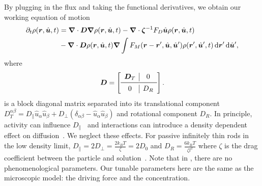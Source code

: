 By plugging in the flux and taking the functional derivatives,  we obtain our
working equation of motion
%
\begin{equation} 
  \label{eqn:working}
  \begin{aligned}
    \partial_t \rho(\bm{r}, \hat{\bm{u}}, t) &= 
    \bm{\nabla} \cdot  \bm{D} \bm{\nabla} \rho (\bm{r}, \hat{\bm{u}}, t) 
    - \bm{\nabla}  \cdot \bm{\zeta}^{-1} F_D 
    \hat{\bm{u}} \rho( \bm{r}, \hat{\bm{u}}, t ) \\
    &-\bm{\nabla} \cdot  \bm{D}  \rho (\bm{r}, \hat{\bm{u}}, t)
    \bm{\nabla}
    \int  F_{M}(\bm{r} - \bm{r}',\hat{\bm{u}}, \hat{\bm{u}}') 
    \rho(\bm{r}',\hat{\bm{u}}',t)  \mathop{}\!\mathrm{d} \bm{r}' \mathop{}\!\mathrm{d} \hat{\bm{u}}',
  \end{aligned} 
\end{equation}
%
where
\begin{equation}
  \bm{D} =
\left[
\begin{array}{c c c}
  \bm{D}_T & \rvline & 0\\
\midrule
 0  & \rvline & D_R
 \end{array}
\right].
\end{equation}
%
is a block diagonal matrix separated into its translational component $
D_T^{\alpha \beta} = D_{\parallel} \hat{u}_{\alpha} \hat{u}_{\beta} + D_{\perp}
(\delta_{\alpha \beta} - \hat{u}_{\alpha} \hat{u}_{\beta} ) $ and rotational
component $D_R$. In principle, activity can influence
$D_{\parallel}$~\cite{baskaran_enhanced_08} and interactions can introduce a
density dependent effect on diffusion~\cite{doi_theory_88}. We neglect these
effects.  For passive infinitely thin rods in the low density limit, $
D_{\parallel} = 2 D_{\perp} =  \frac{2  k_B T}{\zeta} = 2 D_0$ and  $D_R =
\frac{6 k_B T}{ \zeta l^2} $ where $\zeta$ is the drag coefficient between the
particle and solution~\cite{doi_theory_88}. Note that in ,
there are no phenomenological parameters. Our tunable parameters here are the
same as the microscopic model: the driving force and the concentration. 


